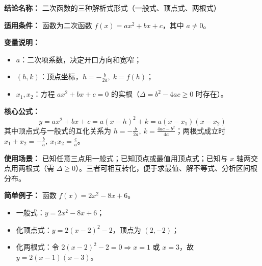 \textbf{结论名称：} 二次函数的三种解析式形式（一般式、顶点式、两根式）

\textbf{适用条件：} 函数为二次函数 \( f(x)=ax^2+bx+c \)，其中 \( a\neq0 \)。

\textbf{变量说明：}
\begin{itemize}
    \item \( a \)：二次项系数，决定开口方向和宽窄；
    \item \( (h,k) \)：顶点坐标，\( h=-\frac{b}{2a},\; k=f(h) \)；
    \item \( x_1,x_2 \)：方程 \( ax^2+bx+c=0 \) 的实根（\( \Delta=b^2-4ac \ge 0 \) 时存在）。
\end{itemize}

\textbf{核心公式：}
\[
\boxed{y=ax^2+bx+c=a(x-h)^2+k=a(x-x_1)(x-x_2)}
\]
其中顶点式与一般式的互化关系为 \( h=-\frac{b}{2a},\ k=\frac{4ac-b^2}{4a} \)；两根式成立时 \( x_1+x_2=-\frac{b}{a},\ x_1x_2=\frac{c}{a} \)。

\textbf{使用场景：}
已知任意三点用一般式；已知顶点或最值用顶点式；已知与 \( x \) 轴两交点用两根式（需 \( \Delta\ge0 \)）。三者可相互转化，便于求最值、解不等式、分析区间根分布。

\textbf{简单例子：}
函数 \( f(x)=2x^2-8x+6 \)。
\begin{itemize}
    \item 一般式：\( y=2x^2-8x+6 \)；
    \item 化顶点式：\( y=2(x-2)^2-2 \)，顶点为 \( (2,-2) \)；
    \item 化两根式：令 \( 2(x-2)^2-2=0 \Rightarrow x=1 \) 或 \( x=3 \)，故 \( y=2(x-1)(x-3) \)。
\end{itemize}